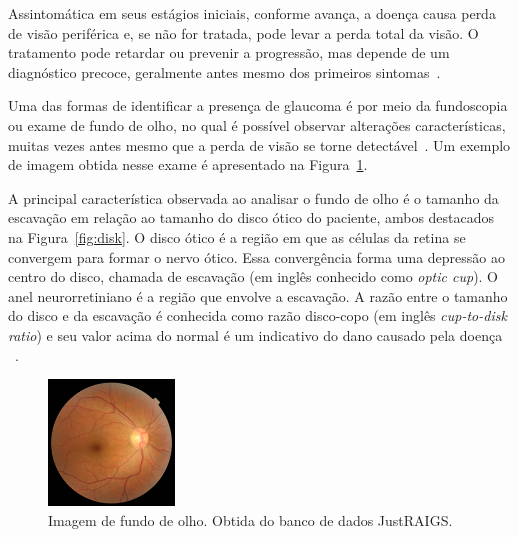 \documentclass[12pt]{article}
\begin{document}
Assintomática em seus estágios iniciais, conforme avança, a doença causa perda de visão periférica e, se não for tratada, pode levar a perda total da visão. O tratamento pode retardar ou prevenir a progressão, mas depende de um diagnóstico precoce, geralmente antes mesmo dos primeiros sintomas~\cite{who_2019}.

Uma das formas de identificar a presença de glaucoma é por meio da fundoscopia ou exame de fundo de olho, no qual é possível observar alterações características, muitas vezes antes mesmo que a perda de visão se torne detectável~\cite{weinreb_2004}. Um exemplo de imagem obtida nesse exame é apresentado na Figura~\ref{fig:fundus}.

A principal característica observada ao analisar o fundo de olho é o tamanho da escavação em relação ao tamanho do disco ótico do paciente, ambos destacados na Figura~\ref{fig:disk}. O disco ótico é a região em que as células da retina se convergem para formar o nervo ótico. Essa convergência forma uma depressão ao centro do disco, chamada de escavação (em inglês conhecido como \emph{optic cup}). O anel neurorretiniano é a região que envolve a escavação. A razão entre o tamanho do disco e da escavação é conhecida como razão disco-copo (em inglês \emph{cup-to-disk ratio}) e seu valor acima do normal é um indicativo do dano causado pela doença ~\cite{weinreb_2004}. %

\begin{figure}[htb]
 \centering
 \includegraphics[width=0.3\textwidth]{images/TRAIN000004_cut.JPG}
 \caption{Imagem de fundo de olho. Obtida do banco de dados JustRAIGS.}
 \label{fig:fundus}
\end{figure}
\end{document}
